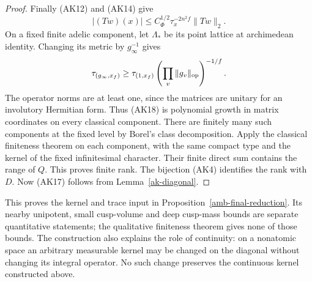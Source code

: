 \begin{proof}
Finally (AK12) and (AK14) give
\[
                 |(Tw)(x)|\le
                  C_\Phi^{1/2}\tau_x^{-2n^2f}\|Tw\|_2 .
 \tag{AK18}
\]
On a fixed finite adelic component, let \(\Lambda_*\)
be its point lattice at archimedean identity.
Changing its metric by \(g_\infty^{-1}\) gives
\[
       \tau_{(g_\infty,x_f)}
             \ge\tau_{(1,x_f)}
                   \left(\prod_v\|g_v\|_{\rm op}\right)^{-1/f}.
\]
The operator norms are at least one, since the
matrices are unitary for an involutory Hermitian form.
Thus (AK18) is polynomial growth in matrix coordinates
on every classical component.  There are finitely many
such components at the fixed level by Borel's class
decomposition.  Apply the classical finiteness theorem
on each component, with the same compact type and
the kernel of the fixed infinitesimal character.
Their finite direct sum contains the range of \(Q\).
This proves finite rank.
The bijection (AK4) identifies the rank with \(D\).
Now (AK17) follows from Lemma~\ref{ak-diagonal}.
\end{proof}

This proves the kernel and trace input in
Proposition~\ref{amb-final-reduction}.  Its nearby
unipotent, small cusp-volume and deep cusp-mass bounds
are separate quantitative statements; the qualitative
finiteness theorem gives none of those bounds.
The construction also explains the role of continuity:
on a nonatomic space an arbitrary measurable kernel
may be changed on the diagonal without changing its
integral operator.  No such change preserves the
continuous kernel constructed above.


